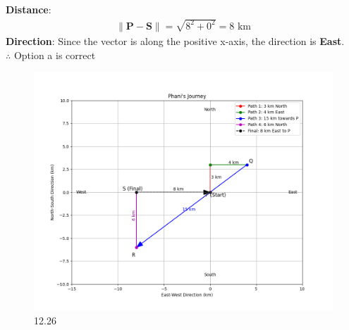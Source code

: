 \documentclass[journal]{IEEEtran}
\begin{document}
\textbf{Distance}:
\begin{align}
\|\mathbf{P} - \mathbf{S}\| = \sqrt{8^2 + 0^2} = 8 \text{ km}
\end{align}
\textbf{Direction}: Since the vector is along the positive x-axis, the direction is \textbf{East}.\\
$\therefore$ Option a is correct

\begin{figure}[H]
    \centering
    \includegraphics[width=0.85\columnwidth]{figs/graph19.png}
    \caption{12.26}
    \label{fig:placeholder}
\end{figure}
\end{document}
